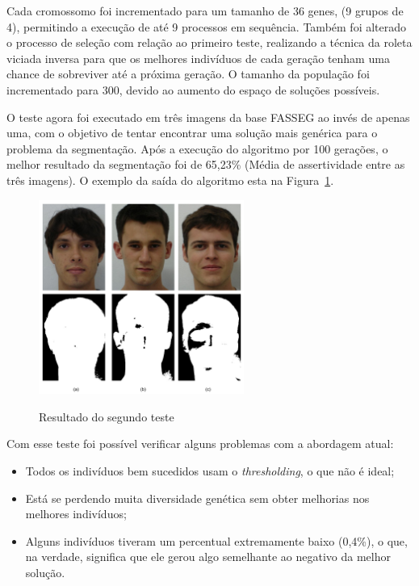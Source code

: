 \documentclass[12pt,oneside,a4paper,english,french,spanish,brazil,]{abntex2}
\begin{document}
Cada cromossomo foi incrementado para um tamanho de 36 genes, (9 grupos de 4), permitindo a execução de até 9 processos em sequência. Também foi alterado o processo de seleção com relação ao primeiro teste, realizando a técnica da roleta viciada inversa para que os melhores indivíduos de cada geração tenham uma chance de sobreviver até a próxima geração. O tamanho da população foi incrementado para 300, devido ao aumento do espaço de soluções possíveis.

O teste agora foi executado em três imagens da base FASSEG ao invés de apenas uma, com o objetivo de tentar encontrar uma solução mais genérica para o problema da segmentação. Após a execução do algoritmo por 100 gerações, o melhor resultado da segmentação foi de 65,23\% (Média de assertividade entre as três imagens). O exemplo da saída do algoritmo esta na Figura~\ref{fig:DES_Segundo_Teste}.

\begin{figure}[ht]
\centering
\caption{Resultado do segundo teste}
\includegraphics[width=0.6\textwidth]{imagens/DES_Segundo_Teste.pdf}
\sourceAuthor
\label{fig:DES_Segundo_Teste}
\end{figure}

Com esse teste foi possível verificar alguns problemas com a abordagem atual:
\begin{itemize}
    \item Todos os indivíduos bem sucedidos usam o \textit{thresholding}, o que não é ideal;
    \item Está se perdendo muita diversidade genética sem obter melhorias nos melhores indivíduos;
    \item Alguns indivíduos tiveram um percentual extremamente baixo (0,4\%), o que, na verdade, significa que ele gerou algo semelhante ao negativo da melhor solução.
\end{itemize}
\end{document}
